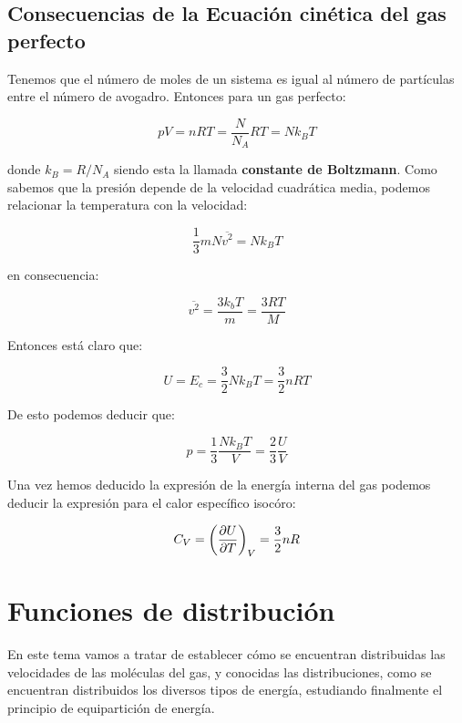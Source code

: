 \documentclass[12pt,a4paper,oneside]{book}
\begin{document}
\section{Consecuencias de la Ecuación cinética del gas perfecto}

Tenemos que el número de moles de un sistema es igual al número de partículas entre el número de avogadro. Entonces para un gas perfecto:

\begin{equation}
p V = n RT = \dfrac{N}{N_A} RT = N k_B T
\end{equation}

donde $k_B = R/N_A$ siendo esta la llamada \textbf{constante de Boltzmann}. Como sabemos que la presión depende de la velocidad cuadrática media, podemos relacionar la temperatura con la velocidad:

$$ \dfrac{1}{3} m N \overline{v^2} = N k_B T $$

en consecuencia:

\begin{equation}
\overline{v^2} = \dfrac{3 k_b T}{m} = \dfrac{3 R T}{M}
\end{equation}

Entonces está claro que: 

\begin{equation}
U = E_c = \dfrac{3}{2} N k_B T = \dfrac{3}{2} n RT
\end{equation}

De esto podemos deducir que: 

\begin{equation}
p = \dfrac{1}{3} \dfrac{N k_B T}{V} = \dfrac{2}{3} \dfrac{U}{V}
\end{equation}

Una vez hemos deducido la expresión de la energía interna del gas podemos deducir la expresión para el calor específico isocóro:

\begin{equation}
C_V = \left( \frac{\partial U}{\partial T} \right)_V = \dfrac{3}{2} n R
\end{equation}

\chapter{Funciones de distribución}

En este tema vamos a tratar de establecer cómo se encuentran distribuidas las velocidades de las moléculas del gas, y conocidas las distribuciones, como se encuentran distribuidos los diversos tipos de energía, estudiando finalmente el principio de equipartición de energía.
\end{document}
